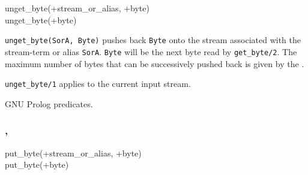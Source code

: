 \begin{TemplatesOneCol}
unget\_byte(+stream\_or\_alias, +byte)\\
unget\_byte(+byte)

\end{TemplatesOneCol}

\Description

\texttt{unget\_byte(SorA, Byte)} pushes back \texttt{Byte} onto the stream
associated with the stream-term or alias \texttt{SorA}. \texttt{Byte} will be
the next byte read by \texttt{get\_byte/2}. The maximum number of bytes that
can be successively pushed back is given by the 
 .

\texttt{unget\_byte/1} applies to the current input stream.

\begin{PlErrors}








\end{PlErrors}

\Portability

GNU Prolog predicates.

\subsubsection{,
               }

\begin{TemplatesOneCol}
put\_byte(+stream\_or\_alias, +byte)\\
put\_byte(+byte)

\end{TemplatesOneCol}

